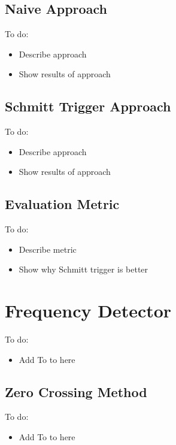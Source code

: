 \subsection{Naive Approach}

\color{red}
To do:
\begin{itemize}
	\item Describe approach
	\item Show results of approach
\end{itemize}
\color{black}

\subsection{Schmitt Trigger Approach}

\color{red}
To do:
\begin{itemize}
	\item Describe approach
	\item Show results of approach
\end{itemize}
\color{black}

\subsection{Evaluation Metric}

\color{red}
To do:
\begin{itemize}
	\item Describe metric
	\item Show why Schmitt trigger is better
\end{itemize}
\color{black}

\section{Frequency Detector}

\color{red}
To do:
\begin{itemize}
	\item Add To to here
\end{itemize}
\color{black}

\subsection{Zero Crossing Method}

\color{red}
To do:
\begin{itemize}
	\item Add To to here
\end{itemize}
\color{black}

